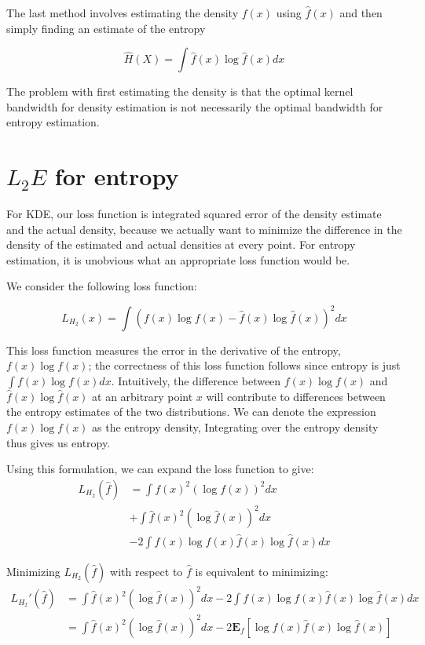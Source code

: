 \documentclass{article}
\begin{document}
The last method involves estimating the density $f(x)$ using $\hat{f}(x)$ and then simply finding an estimate of the entropy

\begin{displaymath}
\hat{H}(X) = \int \hat{f}(x) \log \hat{f}(x) dx
\end{displaymath}

The problem with first estimating the density is that the optimal kernel bandwidth for density estimation is not necessarily the optimal bandwidth for entropy estimation.

\section{$L_2E$ for entropy}

For KDE, our loss function is integrated squared error of the density estimate and the actual density, because we actually want to minimize the difference in the density of the estimated and actual densities at every point. For entropy estimation, it is unobvious what an appropriate loss function would be.

We consider the following loss function:

\begin{displaymath}
L_{H_2}(x) = \int (f(x) \log f(x) - \hat{f}(x) \log \hat{f}(x))^2 dx
\end{displaymath}

This loss function measures the error in the derivative of the entropy, $ f(x) \log f(x) $; the correctness of this loss function follows since entropy is just $ \int f(x) \log f(x) dx $. Intuitively, the difference between $ f(x) \log f(x) $ and $ \hat{f}(x) \log \hat{f}(x) $ at an arbitrary point $ x $ will contribute to differences between the entropy estimates of the two distributions. We can denote the expression $ f(x) \log f(x) $ as the entropy density, Integrating over the entropy density thus gives us entropy.

Using this formulation, we can expand the loss function to give:
\begin{align*}
L_{H_2}(\hat{f})& = \int f(x)^2 (\log f(x))^2 dx\\
& + \int \hat{f}(x)^2 (\log \hat{f}(x))^2 dx\\
& - 2 \int f(x) \log f(x) \hat{f}(x) \log \hat{f}(x) dx
\end{align*}




Minimizing $ L_{H_2}(\hat{f}) $ with respect to $ \hat{f} $ is equivalent to minimizing:
\begin{align*}
L_{H_2}'(\hat{f}) &= \int \hat{f}(x)^2 (\log \hat{f}(x))^2 dx  - 2 \int f(x) \log f(x) \hat{f}(x) \log \hat{f}(x) dx\\
& =\int \hat{f}(x)^2 (\log \hat{f}(x))^2 dx  - 2 \mathbf{E}_f[\log f(x) \hat{f}(x) \log \hat{f}(x)]
\end{align*}
\end{document}
